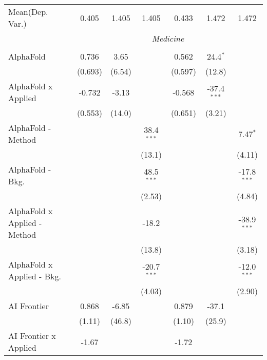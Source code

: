 \begin{tabular}{lcccccc}
Mean(Dep. Var.) & 0.405 & 1.405 & 1.405 & 0.433 & 1.472 & 1.472 \\
 & \multicolumn{6}{c}{\textit{Medicine}} \\ \\
   AlphaFold                    & 0.736         & 3.65   &               & 0.562         & 24.4$^{*}$    &   \\   
                                & (0.693)       & (6.54) &               & (0.597)       & (12.8)        &   \\   
   AlphaFold x Applied          & -0.732        & -3.13  &               & -0.568        & -37.4$^{***}$ &   \\   
                                & (0.553)       & (14.0) &               & (0.651)       & (3.21)        &   \\   
   AlphaFold - Method           &               &        & 38.4$^{***}$  &               &               & 7.47$^{*}$\\   
                                &               &        & (13.1)        &               &               & (4.11)\\   
   AlphaFold - Bkg.             &               &        & 48.5$^{***}$  &               &               & -17.8$^{***}$\\   
                                &               &        & (2.53)        &               &               & (4.84)\\   
   AlphaFold x Applied - Method &               &        & -18.2         &               &               & -38.9$^{***}$\\   
                                &               &        & (13.8)        &               &               & (3.18)\\   
   AlphaFold x Applied - Bkg.   &               &        & -20.7$^{***}$ &               &               & -12.0$^{***}$\\   
                                &               &        & (4.03)        &               &               & (2.90)\\   
   AI Frontier                  & 0.868         & -6.85  &               & 0.879         & -37.1         &   \\   
                                & (1.11)        & (46.8) &               & (1.10)        & (25.9)        &   \\   
   AI Frontier x Applied        & -1.67         &        &               & -1.72         &               &   \\   

\end{tabular}
